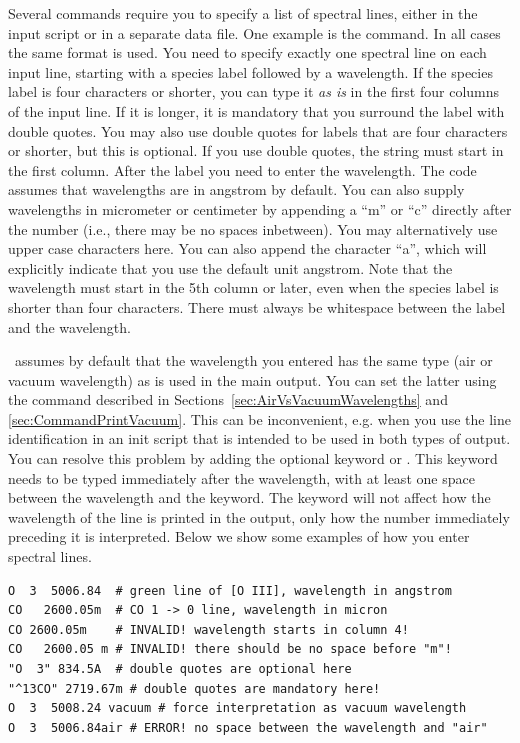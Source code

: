 Several commands require you to specify a list of spectral lines, either in
the input script or in a separate data file. One example is the  command. In all cases the same format is used. You need to
specify exactly one spectral line on each input line, starting with a species
label followed by a wavelength. If the species label is four characters or
shorter, you can type it {\it as is} in the first four columns of the input
line. If it is longer, it is mandatory that you surround the label with double
quotes. You may also use double quotes for labels that are four characters or
shorter, but this is optional. If you use double quotes, the string must start
in the first column. After the label you need to enter the wavelength. The
code assumes that wavelengths are in angstrom by default. You can also
supply wavelengths in micrometer or centimeter by appending a ``m'' or ``c''
directly after the number (i.e., there may be no spaces inbetween). You may
alternatively use upper case characters here. You can also append the character
``a'', which will explicitly indicate that you use the default unit angstrom.
Note that the wavelength must start in the 5th column or later, even when the species
label is shorter than four characters. There must always be whitespace between the
label and the wavelength.

\Cloudy\ assumes by default that the wavelength you entered has the same type
(air or vacuum wavelength) as is used in the main output. You can set the
latter using the  command described in
Sections~\ref{sec:AirVsVacuumWavelengths} and \ref{sec:CommandPrintVacuum}.
This can be inconvenient, e.g. when you use the line identification in an init
script that is intended to be used in both types of output. You can resolve
this problem by adding the optional keyword  or
. This keyword needs to be typed immediately after the
wavelength, with at least one space between the wavelength and the keyword.
The keyword will not affect how the wavelength of the line is printed in the
output, only how the number immediately preceding it is interpreted. Below we
show some examples of how you enter spectral lines.
\begin{verbatim}
O  3  5006.84  # green line of [O III], wavelength in angstrom
CO   2600.05m  # CO 1 -> 0 line, wavelength in micron
CO 2600.05m    # INVALID! wavelength starts in column 4!
CO   2600.05 m # INVALID! there should be no space before "m"!
"O  3" 834.5A  # double quotes are optional here
"^13CO" 2719.67m # double quotes are mandatory here!
O  3  5008.24 vacuum # force interpretation as vacuum wavelength
O  3  5006.84air # ERROR! no space between the wavelength and "air"
\end{verbatim}

